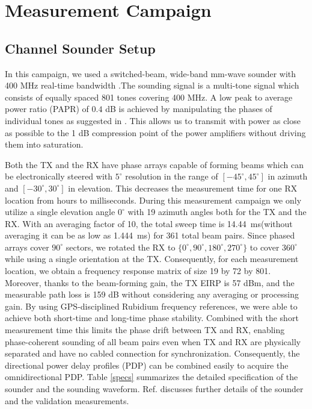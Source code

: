 \documentclass[conference]{IEEEtran}
\begin{document}
\section{Measurement Campaign} \label{sec:meas}


\subsection{Channel Sounder Setup}
In this campaign, we used a switched-beam, wide-band mm-wave sounder with 400 MHz real-time bandwidth \cite{bas_2017_realtime}.The sounding signal is a multi-tone signal which consists of equally spaced 801 tones covering 400 MHz. A low peak to average power ratio (PAPR) of $0.4$ dB is achieved by manipulating the phases of individual tones as suggested in \cite{Friese1997multitone}. This allows us to transmit with power as close as possible to the 1 dB compression point of the power amplifiers without driving them into saturation.  

Both the TX and the RX have phase arrays capable of forming beams which can be electronically steered with $5^{\circ}$ resolution in the range of $[-45^{\circ}, 45^{\circ}]$ in azimuth and $[-30^{\circ}, 30^{\circ}]$ in elevation. This decreases the measurement time for one RX location from hours to milliseconds. During this measurement campaign we only utilize a single elevation angle $0^{\circ}$ with 19 azimuth angles both for the TX and the RX. With an averaging factor of 10, the total sweep time is \SI{14.44}{ms}(without averaging it can be as low as \SI{1.444}{ms}) for 361 total beam pairs. Since phased arrays cover $90^{\circ}$ sectors, we rotated the RX to $\{0^{\circ},90^{\circ},180^{\circ},270^{\circ}\}$ to cover $360^{\circ}$ while using a single orientation at the TX. Consequently, for each measurement location, we obtain a frequency response matrix of size 19 by 72 by 801.  Moreover, thanks to the beam-forming gain, the TX EIRP is 57 dBm, and the measurable path loss is 159 dB without considering any averaging or processing gain. By using GPS-disciplined Rubidium frequency references, we were able to achieve both short-time and long-time phase stability. Combined with the short measurement time this limits the phase drift between TX and RX, enabling phase-coherent sounding of all beam pairs even when TX and RX are physically separated and have no cabled connection for synchronization. Consequently, the directional power delay profiles (PDP) can be combined easily to acquire the omnidirectional PDP. Table \ref{specs} summarizes the detailed specification of the sounder and the sounding waveform. Ref. 
 \cite{bas_2017_realtime} discusses further details of the sounder and the validation measurements.
\end{document}
